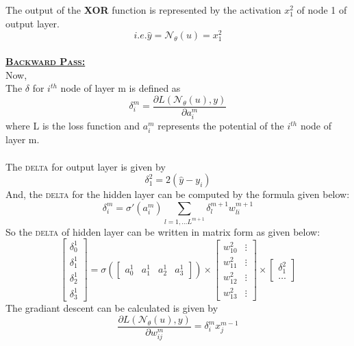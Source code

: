 \documentclass[a4paper,11pt]{article}
\begin{document}
The output of the \textbf{XOR} function is represented by the activation $x_1^2$ of node 1 of output layer.
\begin{equation}
	i.e. \hat{y} =\mathcal{N}_\theta(u) = x_1^2 
\end{equation}
\\
\large{\textbf{\underline{\textsc{Backward Pass:}}}}\\
Now, \\
The $\delta$ for $i^{th}$ node of layer m is defined as
\begin{equation}
\delta^m_i = \frac{\partial L(\mathcal{N}_\theta(u),y)}{\partial a_i^m}
\end{equation}
where L is the loss function and $a_i^m$ represents the potential of the $i^{th}$ node of layer m.\\\\
The \textsc{delta} for output layer is given by
\begin{equation}
	\delta_1^2 = 2(\hat{y} - y_i)
\end{equation}
And, the \textsc{delta} for the hidden layer can be computed by the formula given below:
\begin{equation}
\delta^m_i = \sigma'\left(a_i^m\right) \sum_{l = 1,...L^{m+1}} \delta_l^{m+1}w_{li}^{m+1}
\end{equation}
So the \textsc{delta} of hidden layer can be written in matrix form as given below:
$$
\left[
\begin{matrix}
\delta^1_0\\\delta^1_1\\\delta^1_2\\\delta^1_3
\end{matrix}
\right]
=
\sigma
\left(
\left[
\begin{matrix}
a_0^1 &  a^1_1 & a_2^1 & a_3^1
\end{matrix}
\right]
\right)
\times
\left[
\begin{matrix}
	w_{10}^2 &\vdots \\ w_{11}^2 &\vdots \\ w_{12}^2 &\vdots \\ w_{13}^2  & \vdots 
\end{matrix}
\right]
\times
\left[
\begin{matrix}
	\delta_1^2 \\\hdots
\end{matrix}
\right]
$$
The gradiant descent can be calculated is given by
\begin{equation}
	\frac{\partial L(\mathcal{N}_\theta(u),y)}{\partial w_{ij}^m} = \delta^m_i x_j^{m-1}
\end{equation}
\end{document}
